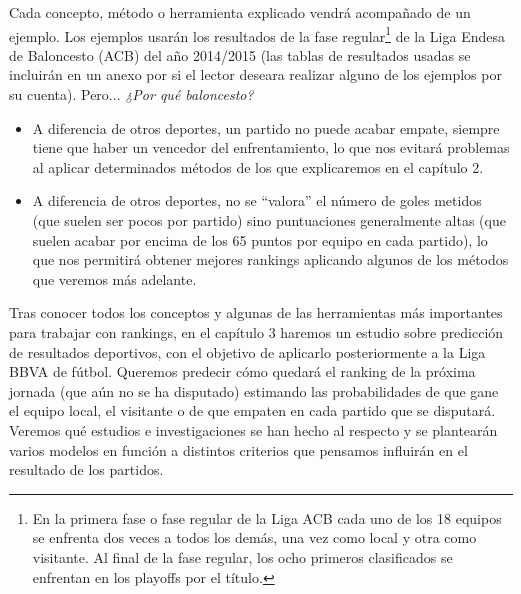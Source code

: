 Cada concepto, método o herramienta explicado vendrá acompañado de un ejemplo. Los ejemplos usarán los resultados de la fase regular\footnote{En la primera fase o fase regular de la Liga ACB cada uno de los 18 equipos se enfrenta dos veces a todos los demás, una vez como local y otra como visitante. Al final de la fase regular, los ocho primeros clasificados se enfrentan en los playoffs por el título.} de la Liga Endesa de Baloncesto (ACB) del año 2014/2015 (las tablas de resultados usadas se incluirán en un anexo por si el lector deseara realizar alguno de los ejemplos por su cuenta). Pero... \textit{¿Por qué baloncesto?}

\begin{itemize}
	\item A diferencia de otros deportes, un partido no puede acabar empate, siempre tiene que haber un vencedor del enfrentamiento, lo que nos evitará problemas al aplicar determinados métodos de los que explicaremos en el capítulo 2. 
	\item A diferencia de otros deportes, no se ``valora'' el número de goles metidos (que suelen ser pocos por partido) sino puntuaciones generalmente altas (que suelen acabar por encima de los 65 puntos por equipo en cada partido), lo que nos permitirá obtener mejores rankings aplicando algunos de los métodos que veremos más adelante. 
\end{itemize}

Tras conocer todos los conceptos y algunas de las herramientas más importantes para trabajar con rankings, en el capítulo 3 haremos un estudio sobre predicción de resultados deportivos, con el objetivo de aplicarlo posteriormente a la Liga BBVA de fútbol. Queremos predecir cómo quedará el ranking de la próxima jornada (que aún no se ha disputado) estimando las probabilidades de que gane el equipo local, el visitante o de que empaten en cada partido que se disputará. Veremos qué estudios e investigaciones se han hecho al respecto y se plantearán varios modelos en función a distintos criterios que pensamos influirán en el resultado de los partidos.